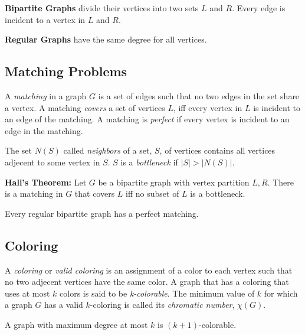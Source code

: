 \documentclass[../main.tex]{subfiles}
\begin{document}
\textbf{Bipartite Graphs} divide their vertices into two sets $L$ and $R$. Every edge is incident to a vertex in $L$ and $R$.

\textbf{Regular Graphs} have the same degree for all vertices.

\subsection{Matching Problems}

A \textit{matching} in a graph $G$ is a set of edges such that no two edges in the set share a vertex. A matching \textit{covers} a set of vertices $L$, iff every vertex in $L$ is incident to an edge of the matching. A matching is \textit{perfect} if every vertex is incident to an edge in the matching.

The set $N(S)$ called \textit{neighbors} of a set, $S$, of vertices contains all vertices adjecent to some vertex in $S$. $S$ is a \textit{bottleneck} if $|S| > |N(S)|$.

\textbf{Hall's Theorem:}
Let $G$ be a bipartite graph with vertex partition $L, R$. There is a matching in $G$ that covers $L$ iff no subset of $L$ is a bottleneck.

Every regular bipartite graph has a perfect matching.

\subsection{Coloring}

A \textit{coloring} or \textit{valid coloring} is an assignment of a color to each vertex such that no two adjecent vertices have the same color. A graph that has a coloring that uses at most $k$ colors is said to be \textit{k-colorable}. The minimum value of $k$ for which a graph $G$ has a valid $k$-coloring is called its \textit{chromatic number}, $\chi(G)$.

A graph with maximum degree at most $k$ is $(k+1)$-colorable. 
\end{document}
